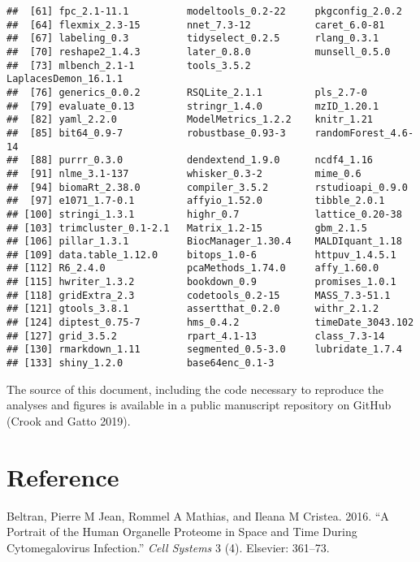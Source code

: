 \documentclass[]{article}
\begin{document}
\begin{verbatim}
##  [61] fpc_2.1-11.1          modeltools_0.2-22     pkgconfig_2.0.2      
##  [64] flexmix_2.3-15        nnet_7.3-12           caret_6.0-81         
##  [67] labeling_0.3          tidyselect_0.2.5      rlang_0.3.1          
##  [70] reshape2_1.4.3        later_0.8.0           munsell_0.5.0        
##  [73] mlbench_2.1-1         tools_3.5.2           LaplacesDemon_16.1.1 
##  [76] generics_0.0.2        RSQLite_2.1.1         pls_2.7-0            
##  [79] evaluate_0.13         stringr_1.4.0         mzID_1.20.1          
##  [82] yaml_2.2.0            ModelMetrics_1.2.2    knitr_1.21           
##  [85] bit64_0.9-7           robustbase_0.93-3     randomForest_4.6-14  
##  [88] purrr_0.3.0           dendextend_1.9.0      ncdf4_1.16           
##  [91] nlme_3.1-137          whisker_0.3-2         mime_0.6             
##  [94] biomaRt_2.38.0        compiler_3.5.2        rstudioapi_0.9.0     
##  [97] e1071_1.7-0.1         affyio_1.52.0         tibble_2.0.1         
## [100] stringi_1.3.1         highr_0.7             lattice_0.20-38      
## [103] trimcluster_0.1-2.1   Matrix_1.2-15         gbm_2.1.5            
## [106] pillar_1.3.1          BiocManager_1.30.4    MALDIquant_1.18      
## [109] data.table_1.12.0     bitops_1.0-6          httpuv_1.4.5.1       
## [112] R6_2.4.0              pcaMethods_1.74.0     affy_1.60.0          
## [115] hwriter_1.3.2         bookdown_0.9          promises_1.0.1       
## [118] gridExtra_2.3         codetools_0.2-15      MASS_7.3-51.1        
## [121] gtools_3.8.1          assertthat_0.2.0      withr_2.1.2          
## [124] diptest_0.75-7        hms_0.4.2             timeDate_3043.102    
## [127] grid_3.5.2            rpart_4.1-13          class_7.3-14         
## [130] rmarkdown_1.11        segmented_0.5-3.0     lubridate_1.7.4      
## [133] shiny_1.2.0           base64enc_0.1-3
\end{verbatim}

The source of this document, including the code necessary to reproduce
the analyses and figures is available in a public manuscript repository
on GitHub (Crook and Gatto 2019).

\section*{Reference}\label{reference}

\hypertarget{refs}{}
\hypertarget{ref-Beltran:2016}{}
Beltran, Pierre M Jean, Rommel A Mathias, and Ileana M Cristea. 2016.
``A Portrait of the Human Organelle Proteome in Space and Time During
Cytomegalovirus Infection.'' \emph{Cell Systems} 3 (4). Elsevier:
361--73.
\end{document}
